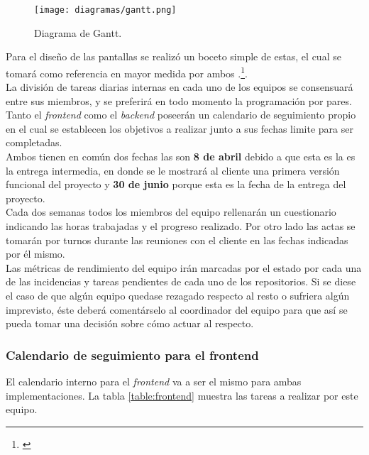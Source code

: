 \documentclass[11pt, a4paper, titlepage]{article}
\begin{document}
\begin{landscape}
    \pagestyle{empty}
    \begin{figure}[!p]
    \centering
    
    \texttt{[image: diagramas/gantt.png]}
    \caption{Diagrama de Gantt.}
    \label{fig:gantt}
\end{figure}
\end{landscape}

 Para el diseño de las pantallas se realizó un boceto simple de estas, el cual se tomará como referencia en mayor medida por ambos .\footnote{\href{https://github.com/UNIZAR-30226-2022-01/proyecto_software_documentacion/tree/main/imagenes}{}}.
\\

La división de tareas diarias internas en cada uno de los equipos se consensuará entre sus miembros, y se preferirá en todo momento la programación por pares.\\

Tanto el \textit{frontend} como el \textit{backend} poseerán un calendario de seguimiento propio en el cual se establecen los objetivos a realizar junto a sus fechas limite para ser completadas. \\

Ambos tienen en común dos fechas las son \textbf{8 de abril} debido a que esta es la es la entrega intermedia, en donde se le mostrará al cliente una primera versión funcional del proyecto
y \textbf{30 de junio} porque esta es la fecha de la entrega del proyecto.\\

Cada dos semanas todos los miembros del equipo rellenarán un cuestionario indicando las horas trabajadas y el progreso realizado. Por otro lado las actas se tomarán por turnos durante las reuniones con el cliente en las fechas indicadas por él mismo.\\

Las métricas de rendimiento del equipo irán marcadas por el estado por cada una de las incidencias y tareas pendientes de cada uno de los repositorios. Si se diese el caso de que algún equipo quedase rezagado respecto al resto o sufriera algún imprevisto, éste deberá comentárselo al coordinador del equipo para que así se pueda tomar una decisión sobre cómo actuar al respecto. 

\subsubsection{Calendario de seguimiento para el frontend}
El calendario interno para el \textit{frontend} va a ser el mismo para ambas implementaciones. La tabla \ref{table:frontend} muestra las tareas a realizar por este equipo. \newline
\end{document}
